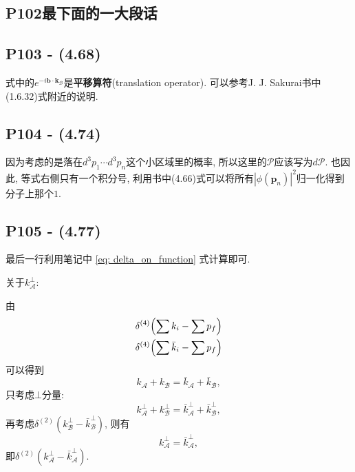 \subsection{P102最下面的一大段话}


\subsection{P103 - (4.68)}

式中的$e^{-i\mathbf{b}\cdot\mathbf{k_{\mathcal{B}}}}$是\textbf{平移算符}(translation operator).
可以参考J. J. Sakurai书中(1.6.32)式附近的说明.

\subsection{P104 - (4.74)}

因为考虑的是落在$d^3p_1\cdots d^3p_n$这个小区域里的概率, 所以这里的$\mathcal{P}$应该写为$d\mathcal{P}$.
也因此, 等式右侧只有一个积分号, 利用书中(4.66)式可以将所有$|\phi(\mathbf{p}_n)|^2$归一化得到分子上那个$1$.

\subsection{P105 - (4.77)}

最后一行利用笔记中 \eqref{eq: delta_on_function} 式计算即可.

关于$k_{\mathcal{A}}^{\bot}$:

由
\begin{gather}
  \delta^{(4)}\Bigl(\sum k_i - \sum p_f\Bigr) \\
  \delta^{(4)}\Bigl(\sum \bar{k}_i - \sum p_f\Bigr)
\end{gather}
可以得到
\begin{equation}
  k_\mathcal{A} + k_\mathcal{B} = \bar{k}_\mathcal{A} + \bar{k}_\mathcal{B},
\end{equation}
只考虑$\bot$分量:
\begin{equation}
  k_{\mathcal{A}}^{\bot} + k_{\mathcal{B}}^{\bot} = \bar{k}_{\mathcal{A}}^{\bot} + \bar{k}_{\mathcal{B}}^{\bot},
\end{equation}
再考虑$\delta^{(2)}(k_{\mathcal{B}}^{\bot} - \bar{k}_{\mathcal{B}}^{\bot})$, 则有
\begin{equation}
  k_{\mathcal{A}}^{\bot} = \bar{k}_{\mathcal{A}}^{\bot},
\end{equation}
即$\delta^{(2)}(k_{\mathcal{A}}^{\bot} - \bar{k}_{\mathcal{A}}^{\bot})$.

